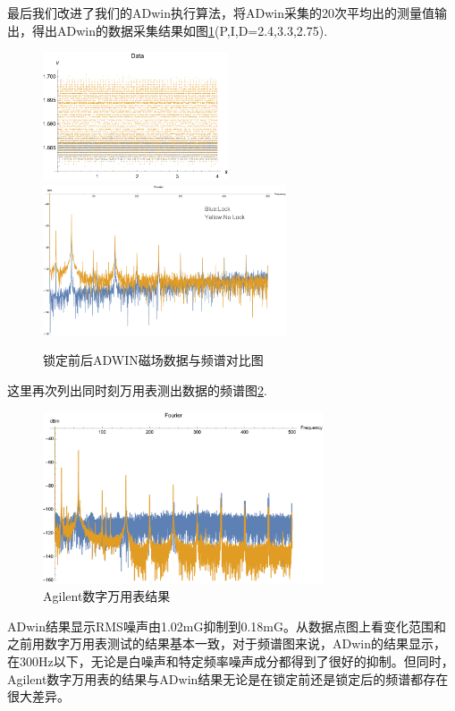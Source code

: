 \documentclass[onecolumn,a4paper,10pt]{article}
\begin{document}
最后我们改进了我们的ADwin执行算法，将ADwin采集的20次平均出的测量值输出，得出ADwin的数据采集结果如图\ref{fig:1029}(P,I,D=2.4,3.3,2.75).
\begin{figure}[htbp]
\centering
\includegraphics[height=1.5in]{DataAdwin}%
\hspace{0.4in}%
\includegraphics[height=1.75in]{FourierAdwin}
\caption{锁定前后ADWIN磁场数据与频谱对比图}
\label{fig:1029}
\end{figure}

这里再次列出同时刻万用表测出数据的频谱图\ref{fig:Multimeter2}.

\begin{figure}[htbp]
\centering
\includegraphics[height=2in]{Multimeter2}
\caption{Agilent数字万用表结果}
\label{fig:Multimeter2}
\end{figure}


ADwin结果显示RMS噪声由1.02mG抑制到0.18mG。从数据点图上看变化范围和之前用数字万用表测试的结果基本一致，对于频谱图来说，ADwin的结果显示，在300Hz以下，无论是白噪声和特定频率噪声成分都得到了很好的抑制。但同时，Agilent数字万用表的结果与ADwin结果无论是在锁定前还是锁定后的频谱都存在很大差异。
\end{document}

